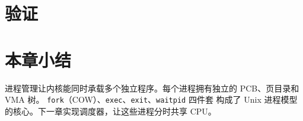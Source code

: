 %

\section{验证}
\label{sec:proc-verify}


\section{本章小结}

进程管理让内核能同时承载多个独立程序。每个进程拥有独立的 PCB、页目录和 VMA 树。
\texttt{fork}（COW）、\texttt{exec}、\texttt{exit}、\texttt{waitpid} 四件套
构成了 Unix 进程模型的核心。下一章实现调度器，让这些进程分时共享 CPU。
